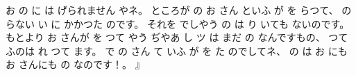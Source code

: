 お
%
の
に
は
げられません
やネ。
%
ところが
の
お
さん
といふ
が
を
らつて、
%
の
らない
い
に
かかつた
のです。
%
それを
でしやう
の
は
り
いても
ないのです。
%
もとより
お
さんが
を
つて
やう
ぢやあ
し
ツ
は
まだ
の
なんですもの、
%
つて
ふのは
れ
つて
ます。
%
で
の
さん
て
いふ
が
を
た
のでしてネ、
%
の
は
お
にも
お
さんにも
の
なのです！。
』
